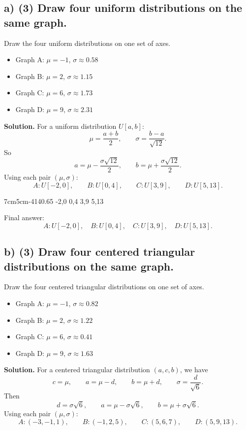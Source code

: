 	\subsection*{a) \textbf{(3)} Draw four uniform distributions on the same graph.}
	\label{subsec:probability-distribution-graphs-c4-a}
	Draw the four uniform distributions on one set of axes.
	\begin{itemize}
		\item Graph A: $\mu=-1$, $\sigma\approx0.58$
		\item Graph B: $\mu=2$, $\sigma\approx1.15$
		\item Graph C: $\mu=6$, $\sigma\approx1.73$
		\item Graph D: $\mu=9$, $\sigma\approx2.31$
	\end{itemize}
	\textbf{Solution.}
	For a uniform distribution $U[a,b]$:
	\[
	\mu=\frac{a+b}{2},
	\qquad
	\sigma=\frac{b-a}{\sqrt{12}}.
	\]
	So
	\[
	a=\mu-\frac{\sigma\sqrt{12}}{2},
	\qquad
	b=\mu+\frac{\sigma\sqrt{12}}{2}.
	\]
	Using each pair $(\mu,\sigma)$:
	\[
	A:U[-2,0],\qquad
	B:U[0,4],\qquad
	C:U[3,9],\qquad
	D:U[5,13].
	\]
	
	\UniformFourGraph
	{7cm}{5cm}{-4}{14}{0.65}
	{-2,0}
	{0,4}
	{3,9}
	{5,13}
	
	Final answer:
	\[
	A:U[-2,0],\quad B:U[0,4],\quad C:U[3,9],\quad D:U[5,13].
	\]
	
	
	\subsection*{b) \textbf{(3)} Draw four centered triangular distributions on the same graph.}
	\label{subsec:probability-distribution-graphs-c4-b}
	Draw the four centered triangular distributions on one set of axes.
	\begin{itemize}
		\item Graph A: $\mu=-1$, $\sigma\approx0.82$
		\item Graph B: $\mu=2$, $\sigma\approx1.22$
		\item Graph C: $\mu=6$, $\sigma\approx0.41$
		\item Graph D: $\mu=9$, $\sigma\approx1.63$
	\end{itemize}
	\textbf{Solution.}
	For a centered triangular distribution $(a,c,b)$, we have
	\[
	c=\mu,\qquad a=\mu-d,\qquad b=\mu+d,\qquad \sigma=\frac{d}{\sqrt{6}}.
	\]
	Then
	\[
	d=\sigma\sqrt{6},
	\qquad
	a=\mu-\sigma\sqrt{6},
	\qquad
	b=\mu+\sigma\sqrt{6}.
	\]
	Using each pair $(\mu,\sigma)$:
	\[
	A:(-3,-1,1),\qquad
	B:(-1,2,5),\qquad
	C:(5,6,7),\qquad
	D:(5,9,13).
	\]
	
